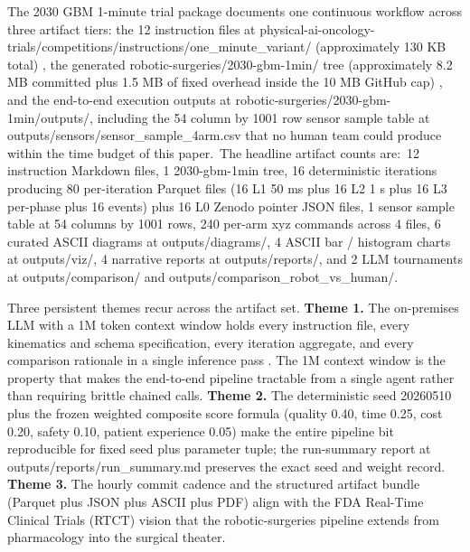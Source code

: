 
The 2030 GBM 1-minute trial package documents one continuous
workflow across three artifact tiers: the 12 instruction files at physical-ai-oncology-trials/competitions/instructions/one_minute_variant/
(approximately 130 KB total)
\cite{one-minute-variant-instructions}, the generated robotic-surgeries/2030-gbm-1min/ tree (approximately
8.2 MB committed plus 1.5 MB of fixed overhead inside the 10 MB
GitHub cap) \cite{repo-robotic-surgeries}, and the end-to-end
execution outputs at robotic-surgeries/2030-gbm-1min/outputs/, including the
54 column by 1001 row sensor sample table at
outputs/sensors/sensor_sample_4arm.csv that no human team could
produce within the time budget of this paper.\ The headline artifact
counts are:\ 12 instruction Markdown files, 1 2030-gbm-1min tree, 16
deterministic iterations producing 80 per-iteration Parquet files
(16 L1 50 ms plus 16 L2 1 s plus 16 L3 per-phase plus 16 events)
plus 16 L0 Zenodo pointer JSON files, 1 sensor sample table at 54
columns by 1001 rows, 240 per-arm xyz commands across 4 files, 6
curated ASCII diagrams at outputs/diagrams/, 4 ASCII bar / histogram
charts at outputs/viz/, 4 narrative reports at outputs/reports/, and
2 LLM tournaments at outputs/comparison/ and
outputs/comparison_robot_vs_human/.

Three persistent themes recur across the artifact set.
\textbf{Theme 1.} The on-premises LLM with a 1M token context window
holds every instruction file, every kinematics and schema
specification, every iteration aggregate, and every comparison
rationale in a single inference pass \cite{claude-opus-47,
claude-code}. The 1M context window is the property that makes the
end-to-end pipeline tractable from a single agent rather than
requiring brittle chained calls. \textbf{Theme 2.} The deterministic
seed 20260510 plus the frozen weighted composite score formula
(quality 0.40, time 0.25, cost 0.20, safety 0.10, patient experience
0.05) make the entire pipeline bit reproducible for fixed seed plus
parameter tuple; the run-summary report at
outputs/reports/run_summary.md preserves the exact seed and weight
record. \textbf{Theme 3.} The hourly commit cadence and the
structured artifact bundle (Parquet plus JSON plus ASCII plus PDF)
align with the FDA Real-Time Clinical Trials (RTCT) vision
\cite{fda2026realtime} that the robotic-surgeries pipeline extends
from pharmacology into the surgical theater.

